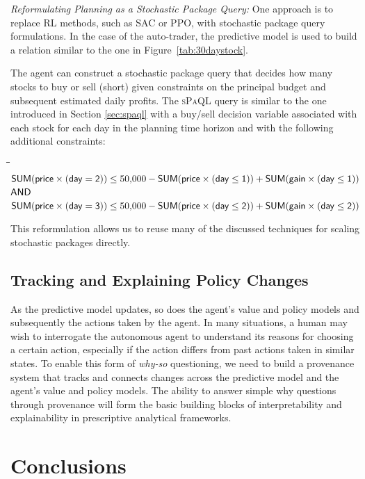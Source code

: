 \documentclass[11pt]{article}
\newcommand{\attr}[1]{{\sf #1}}
\newcommand{\sqlfont}{\small\selectfont\sf}
\newcommand{\ssf}[1]{{${\sf #1}$}}
\newenvironment{sqlquery}{
\sqlfont
\begin{tabbing}
\=\hspace*{0.3cm}\=\hspace*{3cm}\= \kill}%
{\end{tabbing}}
\newcommand{\AND}{\ssf{AND}\xspace}
\newcommand{\SUM}[1]{\text{\ssf{SUM}}(#1)}
\newcommand{\spaql}{\textsc{sPaQL}\xspace}
\begin{document}
\smallskip\textit{Reformulating Planning as a Stochastic Package Query:} One approach is to replace RL methods, such as SAC or PPO, with stochastic package query formulations. In the case of the auto-trader, the predictive model is used to build a relation similar to the one in Figure~\ref{tab:30daystock}.

The agent can construct a stochastic package query that decides how many stocks to buy or sell (short) given constraints on the principal budget and subsequent estimated daily profits. The \spaql query is similar to the one introduced in Section \ref{sec:spaql} with a buy/sell decision variable associated with each stock for each day in the planning time horizon and with the following additional constraints: 
\begin{sqlquery}
\>\>$\SUM{\attr{price \times (day=2)}} \le 50{,}000 - \SUM{\attr{price \times (day\leq1)}} + \SUM{\attr{gain \times (day\leq1)}} $ \AND\\
\>\>$\SUM{\attr{price \times (day=3)}} \le 50{,}000 - \SUM{\attr{price \times (day\leq2)}} + \SUM{\attr{gain \times (day\leq2)}} $
\end{sqlquery}
This reformulation allows us to reuse many of the discussed techniques for scaling stochastic packages directly. 

\subsection{Tracking and Explaining Policy Changes}

As the predictive model updates, so does the agent's value and policy models and subsequently the actions taken by the agent. In many situations, a human may wish to interrogate the autonomous agent to understand its reasons for choosing a certain action, especially if the action differs from past actions taken in similar states. To enable this form of \textit{why-so} questioning, we need to build a provenance system that tracks and connects changes across the predictive model and the agent's value and policy models. The ability to answer simple why questions through provenance will form the basic building blocks of interpretability and explainability in prescriptive analytical frameworks.


\section{Conclusions}
\label{sec:concl}
\end{document}
